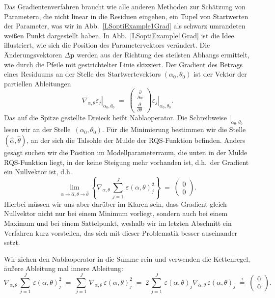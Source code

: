 Das Gradientenverfahren braucht wie alle anderen Methoden zur Schätzung von Parametern, die
nicht linear in die Residuen eingehen, ein Tupel von Startwerten der Parameter, was wir in
Abb.~\ref{LSoptiExample1Grad} als schwarz umrandeten weißen Punkt dargestellt haben.
In Abb.~\ref{LSoptiExample1Grad} ist die Idee illustriert, wie sich die Position des
Parametervektors verändert. Die Änderungsvektoren $\Delta \mathbf{p}$ werden aus der Richtung
des steilsten Abhangs ermittelt, wie durch die Pfeile mit gestrichtelter Linie skizziert. 
Der Gradient des Betrags eines Residuums an der Stelle des Startwertevektors $(\alpha_0, \theta_0)$
ist der Vektor der partiellen Ableitungen
\begin{equation}
\left. \nabla_{\alpha,\theta} \varepsilon_j \right|_{\alpha_0, \theta_0} \; = \;
\left(\begin{array}{c}
\frac{\partial}{\partial \alpha} \\
\frac{\partial}{\partial \theta}
\end{array}\right) \left. \varepsilon_j \right|_{\alpha_0, \theta_0} .
\end{equation}
Das auf die Spitze gestellte Dreieck heißt Nablaoperator.
Die Schreibweise $|_{\alpha_0, \theta_0}$ lesen wir \glqq an der Stelle\grqq ~$(\alpha_0, \theta_0)$.
Für die Minimierung bestimmen wir die Stelle $(\hat \alpha, \hat \theta)$, an der sich die Talsohle
der Mulde der RQS-Funktion befinden. Anders gesagt suchen wir die Position im Modellparameterraum,
die unten in der Mulde RQS-Funktion liegt,
in der keine Steigung mehr vorhanden ist, d.h.\ der Gradient ein Nullvektor ist, d.h.
\begin{equation}
\lim_{\alpha \rightarrow \hat \alpha, \theta \rightarrow \hat \theta} 
\left\{\nabla_{\alpha,\theta} \,
\sum\limits_{j=1}^J \, \varepsilon(\alpha,\theta)_j^2
\right\} \; = \; 
\left(\begin{array}{c}
0 \\
0
\end{array}\right) .
\label{LSschaetzung1}
\end{equation}
Hierbei müssen wir uns aber darüber im Klaren sein, dass Gradient gleich Nullvektor nicht nur
bei einem Minimum vorliegt, sondern auch bei einem Maximum und bei einem Sattelpunkt, weshalb wir
im letzten Abschnitt ein Verfahren kurz vorstellen, das sich mit dieser Problematik besser
auseinander setzt.

Wir ziehen den Nablaoperator in die Summe rein und
verwenden die Kettenregel, äußere Ableitung mal innere Ableitung:
\begin{equation}
\nabla_{\alpha,\theta} \,
\sum\limits_{j=1}^J \, \varepsilon(\alpha,\theta)_j^2
 \; = \; 
\sum\limits_{j=1}^J \, \nabla_{\alpha,\theta} \, \varepsilon(\alpha,\theta)_j^2
 \; = \; 
2 \, \sum\limits_{j=1}^J \, \varepsilon(\alpha,\theta)_j \nabla_{\alpha,\theta} \, \varepsilon(\alpha,\theta)_j
 \; \overset{!}{=} \; 
\left(\begin{array}{c}
0 \\
0
\end{array}\right) .
\label{GradientQ2params}
\end{equation}

